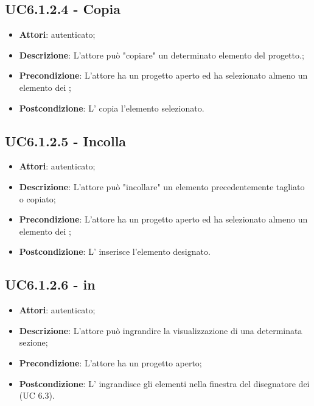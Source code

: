 \subsection{UC6.1.2.4 - Copia}
\label{ssec:UC6.1.2.4}
\begin{itemize}
\item \textbf{Attori}:  autenticato;
\item \textbf{Descrizione}: L’attore può "copiare" un determinato elemento del progetto.;
\item \textbf{Precondizione}: L’attore ha un progetto aperto ed ha selezionato almeno un elemento dei ;
\item \textbf{Postcondizione}: L’ copia l’elemento selezionato.
\end{itemize}
\subsection{UC6.1.2.5 - Incolla}
\label{ssec:UC6.1.2.5}
\begin{itemize}
\item \textbf{Attori}:  autenticato;
\item \textbf{Descrizione}: L’attore può "incollare" un elemento precedentemente tagliato o copiato;
\item \textbf{Precondizione}: L’attore ha un progetto aperto ed ha selezionato almeno un elemento dei ;
\item \textbf{Postcondizione}: L’ inserisce l’elemento designato.
\end{itemize}
\subsection{UC6.1.2.6 -  in}
\label{ssec:UC6.1.2.6}
\begin{itemize}
\item \textbf{Attori}:  autenticato;
\item \textbf{Descrizione}: L’attore può ingrandire la visualizzazione di una determinata sezione;
\item \textbf{Precondizione}: L’attore ha un progetto aperto;
\item \textbf{Postcondizione}: L’ ingrandisce gli elementi nella finestra del disegnatore dei  (UC 6.3).
\end{itemize}
